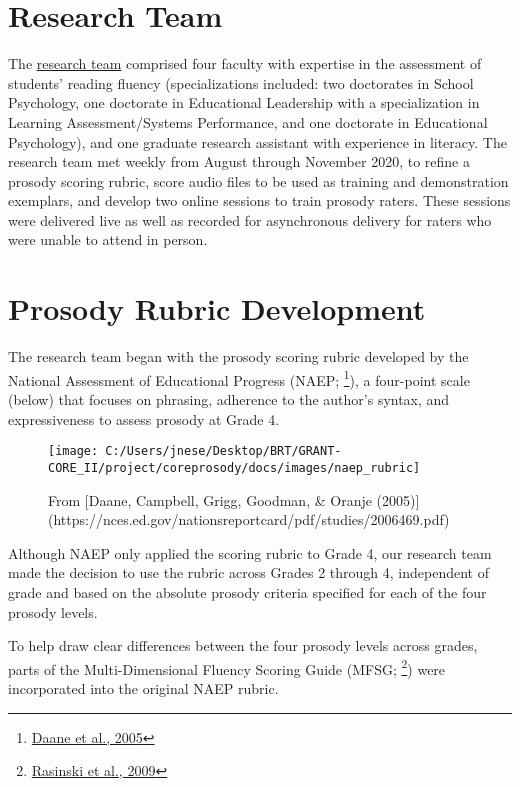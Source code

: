 \documentclass[
]{article}
\begin{document}
\hypertarget{research-team}{%
\section{Research Team}\label{research-team}}

The
\href{https://jnese.github.io/coreprosody/research_team.html}{research
team} comprised four faculty with expertise in the assessment of
students' reading fluency (specializations included: two doctorates in
School Psychology, one doctorate in Educational Leadership with a
specialization in Learning Assessment/Systems Performance, and one
doctorate in Educational Psychology), and one graduate research
assistant with experience in literacy. The research team met weekly from
August through November 2020, to refine a prosody scoring rubric, score
audio files to be used as training and demonstration exemplars, and
develop two online sessions to train prosody raters. These sessions were
delivered live as well as recorded for asynchronous delivery for raters
who were unable to attend in person.

\hypertarget{prosody-rubric-development}{%
\section{Prosody Rubric Development}\label{prosody-rubric-development}}

The research team began with the prosody scoring rubric developed by the
National Assessment of Educational Progress (NAEP; \footnote{\href{https://nces.ed.gov/nationsreportcard/pdf/studies/2006469.pdf}{Daane
  et al., 2005}}), a four-point scale (below) that focuses on phrasing,
adherence to the author's syntax, and expressiveness to assess prosody
at Grade 4.

\begin{figure}
\texttt{[image: C:/Users/jnese/Desktop/BRT/GRANT-CORE\_II/project/coreprosody/docs/images/naep\_rubric]} \caption{From [Daane, Campbell, Grigg, Goodman, & Oranje (2005)](https://nces.ed.gov/nationsreportcard/pdf/studies/2006469.pdf)}\label{fig:unnamed-chunk-1}
\end{figure}

Although NAEP only applied the scoring rubric to Grade 4, our research
team made the decision to use the rubric across Grades 2 through 4,
independent of grade and based on the absolute prosody criteria
specified for each of the four prosody levels.

To help draw clear differences between the four prosody levels across
grades, parts of the Multi-Dimensional Fluency Scoring Guide (MFSG;
\footnote{\href{https://www.tandfonline.com/doi/pdf/10.1080/19388070802468715}{Rasinski
  et al., 2009}}) were incorporated into the original NAEP rubric.
\end{document}
